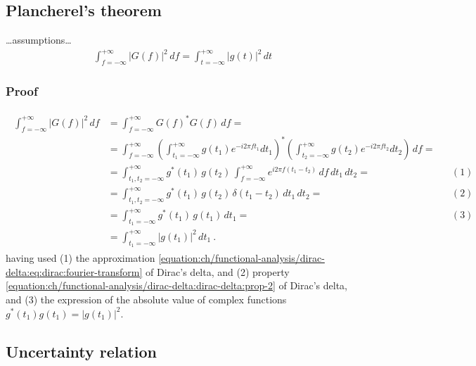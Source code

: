 \documentclass[letterpaper,10pt,english]{jupyterBook}
\begin{document}
\subsection{Plancherel’s theorem}
\label{\detokenize{ch/complex/fourier-transform:plancherel-s-theorem}}\label{\detokenize{ch/complex/fourier-transform:complex-fourier-transform-plancherel}}
\sphinxAtStartPar
…assumptions…
\begin{equation*}
\begin{split}\int_{f=-\infty}^{+\infty} |G(f)|^2 \, df = \int_{t=-\infty}^{+\infty} |g(t)|^2 \, dt \end{split}
\end{equation*}\subsubsection*{Proof}
\begin{equation*}
\begin{split}\begin{aligned}
\int_{f=-\infty}^{+\infty} |G(f)|^2 \, df 
& = \int_{f=-\infty}^{+\infty} G(f)^* G(f) \, df =  \\
& = \int_{f=-\infty}^{+\infty} \left( \int_{t_1=-\infty}^{+\infty} g(t_1) e^{-i 2 \pi f t_1} dt_1 \right)^* \left( \int_{t_2=-\infty}^{+\infty} g(t_2) e^{-i 2 \pi f t_2} dt_2  \right) \, df =  \\
& =  \int_{t_1, t_2=-\infty}^{+\infty} g^*(t_1) \, g(t_2) \, \int_{f=-\infty}^{+\infty} e^{i 2 \pi f ( t_1 - t_2 )} \, df \, dt_1 \, dt_2 =  && (1) \\
& =  \int_{t_1, t_2=-\infty}^{+\infty} g^*(t_1) \, g(t_2) \, \delta( t_1 - t_2 ) \, dt_1 \, dt_2 = && (2) \\
& =  \int_{t_1=-\infty}^{+\infty} g^*(t_1) \, g(t_1) \, dt_1 = && (3) \\
& =  \int_{t_1=-\infty}^{+\infty} |g(t_1)|^2 \, dt_1 \ .
\end{aligned}\end{split}
\end{equation*}
\sphinxAtStartPar
having used (1) the approximation \eqref{equation:ch/functional-analysis/dirac-delta:eq:dirac:fourier-transform} of Dirac’s delta, and (2) property \eqref{equation:ch/functional-analysis/dirac-delta:dirac-delta:prop-2} of Dirac’s delta, and (3) the expression of the absolute value of complex functions \(g^*(t_1) g(t_1) = |g(t_1)|^2\).


\subsection{Uncertainty relation}
\label{\detokenize{ch/complex/fourier-transform:uncertainty-relation}}\label{\detokenize{ch/complex/fourier-transform:complex-fourier-transform-uncertainty}}
\sphinxstepscope
\end{document}
